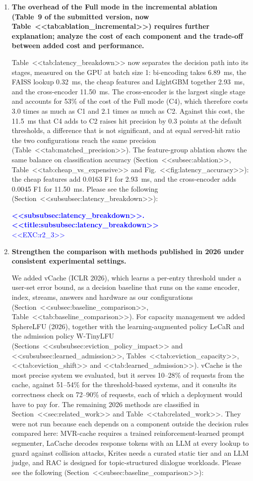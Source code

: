 \documentclass[11pt]{article}
\begin{document}
\begin{enumerate}[leftmargin=*, itemsep=1.2em]
\item \textbf{The overhead of the Full mode in the incremental ablation (Table~9 of the submitted version, now Table~<<tab:ablation_incremental>>) requires further explanation; analyze the cost of each component and the trade-off between added cost and performance.}

Table~<<tab:latency_breakdown>> now separates the decision path into its stages, measured on the GPU at batch size 1: bi-encoding takes 6.89~ms, the FAISS lookup 0.32~ms, the cheap features and LightGBM together 2.93~ms, and the cross-encoder 11.50~ms. The cross-encoder is the largest single stage and accounts for 53\% of the cost of the Full mode (C4), which therefore costs 3.0 times as much as C1 and 2.1 times as much as C2. Against this cost, the 11.5~ms that C4 adds to C2 raises hit precision by 0.3 points at the default thresholds, a difference that is not significant, and at equal served-hit ratio the two configurations reach the same precision (Table~<<tab:matched_precision>>). The feature-group ablation shows the same balance on classification accuracy (Section~<<subsec:ablation>>, Table~<<tab:cheap_vs_expensive>> and Fig.~<<fig:latency_accuracy>>): the cheap features add 0.0163 F1 for 2.93~ms, and the cross-encoder adds 0.0045 F1 for 11.50~ms. Please see the following (Section~<<subsubsec:latency_breakdown>>):

\textcolor{blue}{\textbf{<<subsubsec:latency_breakdown>>. <<title:subsubsec:latency_breakdown>>}\\
<<EXC:r2_3>>}

\item \textbf{Strengthen the comparison with methods published in 2026 under consistent experimental settings.}

We added vCache (ICLR 2026), which learns a per-entry threshold under a user-set error bound, as a decision baseline that runs on the same encoder, index, streams, answers and hardware as our configurations (Section~<<subsec:baseline_comparison>>, Table~<<tab:baseline_comparison>>). For capacity management we added SphereLFU (2026), together with the learning-augmented policy LeCaR and the admission policy W-TinyLFU (Sections~<<subsubsec:eviction_policy_impact>> and <<subsubsec:learned_admission>>, Tables~<<tab:eviction_capacity>>, <<tab:eviction_shift>> and <<tab:learned_admission>>). vCache is the most precise system we evaluated, but it serves 10--28\% of requests from the cache, against 51--54\% for the threshold-based systems, and it consults its correctness check on 72--90\% of requests, each of which a deployment would have to pay for. The remaining 2026 methods are classified in Section~<<sec:related_work>> and Table~<<tab:related_work>>. They were not run because each depends on a component outside the decision rules compared here: MVR-cache requires a trained reinforcement-learned prompt segmenter, LaCache decodes response tokens with an LLM at every lookup to guard against collision attacks, Krites needs a curated static tier and an LLM judge, and RAC is designed for topic-structured dialogue workloads. Please see the following (Section~<<subsec:baseline_comparison>>):


\end{enumerate}
\end{document}
